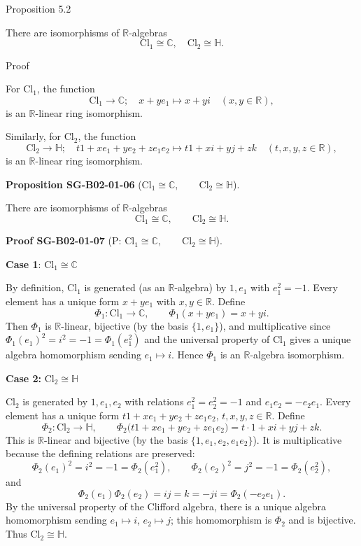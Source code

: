 \documentclass[10pt, letterpaper]{article}
\newcommand{\R}{\mathbb{R}}
\newcommand{\QU}{\mathbb{H}}
\newcommand{\C}{\mathbb{C}}
\newcommand{\Cl}{\mathrm{Cl}}
\newcommand{\CustomHeading}[3]{%
  \par\medskip\noindent%
  \textbf{#1 #2} \textnormal{(#3)}.\enskip%
}
\newenvironment{PROP}[2]{\begin{unitbox}\CustomHeading{Proposition}{#1}{#2}}{\end{unitbox}}
\newenvironment{PROOF}[2]{\begin{unitbox}\CustomHeading{Proof}{#1}{#2}}{\end{unitbox}}
\begin{document}
Proposition 5.2

There are isomorphisms of $\mathbb{R}$-algebras
$$
\mathrm{Cl}_{1} \cong \mathbb{C}, \quad \mathrm{Cl}_{2} \cong \mathbb{H} .
$$


Proof

For $\mathrm{Cl}_{1}$, the function
$$
\mathrm{Cl}_{1} \longrightarrow \mathbb{C} ; \quad x+y e_{1} \longmapsto x+y i \quad(x, y \in \mathbb{R}),
$$
is an $\mathbb{R}$-linear ring isomorphism.

Similarly, for $\mathrm{Cl}_{2}$, the function
$$
\mathrm{Cl}_{2} \longrightarrow \mathbb{H} ; \quad t 1+x e_{1}+y e_{2}+z e_{1} e_{2} \longmapsto t 1+x i+y j+z k \quad(t, x, y, z \in \mathbb{R}),
$$
is an $\mathbb{R}$-linear ring isomorphism.


\begin{PROP}{SG-B02-01-06}{$\Cl_1 \cong \mathbb{C}, \qquad \Cl_2 \cong \mathbb{H}$}
There are isomorphisms of $\mathbb{R}$-algebras
\[
\Cl_1 \cong \mathbb{C}, \qquad \Cl_2 \cong \mathbb{H}.
\]
\end{PROP}






\begin{PROOF}{SG-B02-01-07}{P: $\Cl_1 \cong \mathbb{C}, \qquad \Cl_2 \cong \mathbb{H}$}
\textbf{Case 1}: \(\Cl_1 \cong \C\)

By definition, \(\Cl_1\) is generated (as an \(\R\)-algebra) by \(1,e_1\) with
\(e_1^2=-1\). Every element has a unique form \(x + y e_1\) with \(x,y\in\R\).
Define
\[
\Phi_1:\Cl_1\to\C,\qquad \Phi_1(x+y e_1)=x+yi.
\]
Then \(\Phi_1\) is \(\R\)-linear, bijective (by the basis \(\{1,e_1\}\)),
and multiplicative since \(\Phi_1(e_1)^2=i^2=-1=\Phi_1(e_1^2)\) and the
universal property of \(\Cl_1\) gives a unique algebra homomorphism sending
\(e_1\mapsto i\). Hence \(\Phi_1\) is an \(\R\)-algebra isomorphism.

\medskip
\textbf{Case 2:} \(\Cl_2 \cong \QU\)

\(\Cl_2\) is generated by \(1,e_1,e_2\) with relations
\(e_1^2=e_2^2=-1\) and \(e_1e_2=-e_2e_1\).
Every element has a unique form \(t 1 + x e_1 + y e_2 + z e_1e_2\),
\(t,x,y,z\in\R\). Define
\[
\Phi_2:\Cl_2\to\QU,\qquad
\Phi_2\bigl(t 1 + x e_1 + y e_2 + z e_1e_2\bigr)=t\cdot 1 + x i + y j + z k.
\]
This is \(\R\)-linear and bijective (by the basis \(\{1,e_1,e_2,e_1e_2\}\)).
It is multiplicative because the defining relations are preserved:
\[
\Phi_2(e_1)^2=i^2=-1=\Phi_2(e_1^2),\qquad
\Phi_2(e_2)^2=j^2=-1=\Phi_2(e_2^2),
\]
and
\[
\Phi_2(e_1)\Phi_2(e_2)=ij=k=-ji=\Phi_2(-e_2e_1).
\]
By the universal property of the Clifford algebra, there is a unique
algebra homomorphism sending \(e_1\mapsto i\), \(e_2\mapsto j\);
this homomorphism is \(\Phi_2\) and is bijective. Thus \(\Cl_2\cong\QU\).
\end{PROOF}
\end{document}
